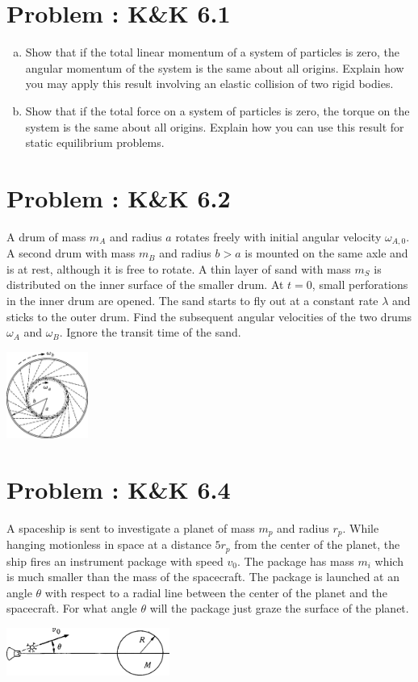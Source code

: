 \documentclass[problems]{esg8012pset}
\date{\today }
\begin{document}
\section{Problem \thesection: K\&K 6.1}
  \begin{enumerate}[(a)]
    \item Show that if the total linear momentum of a system of particles is zero, the angular momentum of the system is the same about all origins. Explain how you may apply this result involving an elastic collision of two rigid bodies.
    \item Show that if the total force on a system of particles is zero, the torque on the system is the same about all origins. Explain how you can use this result for static equilibrium problems.
  \end{enumerate}
\section{Problem \thesection: K\&K 6.2}
  A drum of mass $m_A$ and radius $a$ rotates freely with initial angular velocity $\omega_{A,0}$. A second drum with mass $m_B$ and radius $b > a$ is mounted on the same axle and is at rest, although it is free to rotate. A thin layer of sand with mass $m_S$ is distributed on the inner surface of the smaller drum. At $t = 0$, small perforations in the inner drum are opened. The sand starts to fly out at a constant rate $\lambda$ and sticks to the outer drum. Find the subsequent angular velocities of the two drums $\omega_A$ and $\omega_B$. Ignore the transit time of the sand.
  \begin{center}\includegraphics[width=0.2\textwidth]{ps08_1}\end{center}
\section{Problem \thesection: K\&K 6.4}
  A spaceship is sent to investigate a planet of mass $m_p$ and radius $r_p$. While hanging motionless in space at a distance $5 r_p$ from the center of the planet, the ship fires an instrument package with speed $v_0$. The package has mass $m_i$ which is much smaller than the mass of the spacecraft. The package is launched at an angle $\theta$ with respect to a radial line between the center of the planet and the spacecraft. For what angle $\theta$ will the package just graze the surface of the planet.
  \begin{center}\includegraphics[width=0.4\textwidth]{ps08_2}\end{center}
\end{document}
